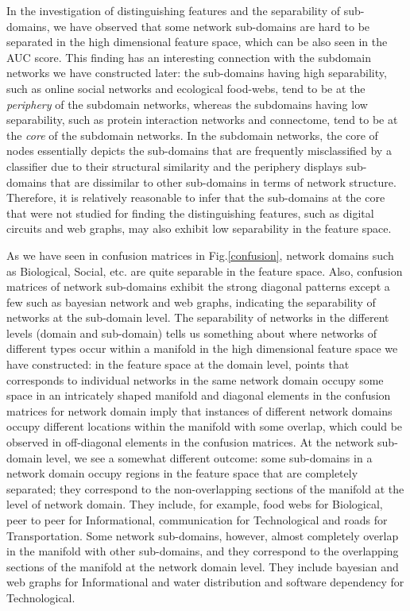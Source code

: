 \documentclass{article}
\begin{document}
In the investigation of distinguishing features and the separability of sub-domains, we have observed that some network sub-domains are hard to be separated in the high dimensional feature space, which can be also seen in the AUC score. This finding has an interesting connection with the subdomain networks we have constructed later: the sub-domains having high separability, such as online social networks and ecological food-webs, tend to be at the \textit{periphery} of the subdomain networks, whereas the subdomains having low separability, such as protein interaction networks and connectome, tend to be at the \textit{core} of the subdomain networks. In the subdomain networks, the core of nodes essentially depicts the sub-domains that are frequently misclassified by a classifier due to their structural similarity and the periphery displays sub-domains that are dissimilar to other sub-domains in terms of network structure. Therefore, it is relatively reasonable to infer that the sub-domains at the core that were not studied for finding the distinguishing features, such as digital circuits and web graphs, may also exhibit low separability in the feature space. 


 As we have seen in confusion matrices in Fig.\ref{confusion}, network domains such as Biological, Social, etc. are quite separable in the feature space. Also, confusion matrices of network sub-domains exhibit the strong diagonal patterns except a few such as bayesian network and web graphs, indicating the separability of networks at the sub-domain level. The separability of networks in the different levels (domain and sub-domain) tells us something about where networks of different types occur within a manifold in the high dimensional feature space we have constructed: in the feature space at the domain level, points that corresponds to individual networks in the same network domain occupy some space in an intricately shaped manifold and diagonal elements in the confusion matrices for network domain imply that instances of different network domains occupy different locations within the manifold with some overlap, which could be observed in off-diagonal elements in the confusion matrices. At the network sub-domain level, we see a somewhat different outcome: some sub-domains in a network domain occupy regions in the feature space that are completely separated; they correspond to the non-overlapping sections of the manifold at the level of network domain. They include, for example, food webs for Biological, peer to peer for Informational, communication for Technological and roads for Transportation. Some network sub-domains, however, almost completely overlap in the manifold with other sub-domains, and they correspond to the overlapping sections of the manifold at the network domain level. They include bayesian and web graphs for Informational and water distribution and software dependency for Technological. 
\end{document}
